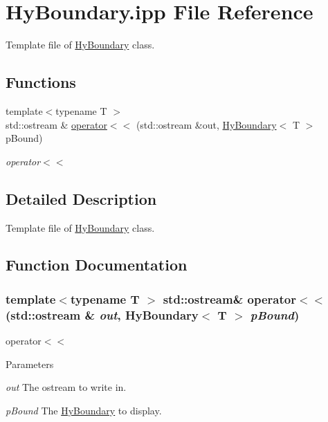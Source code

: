 \hypertarget{HyBoundary_8ipp}{
\section{HyBoundary.ipp File Reference}
\label{HyBoundary_8ipp}
}


Template file of \hyperlink{classHyBoundary}{HyBoundary} class.  


\subsection*{Functions}
\begin{DoxyCompactItemize}
\item 
{\footnotesize template$<$typename T $>$ }\\std::ostream \& \hyperlink{HyBoundary_8ipp_aa17bace639b97b7cdc5fa104cd3d7189}{operator$<$$<$} (std::ostream \&out, \hyperlink{classHyBoundary}{HyBoundary}$<$ T $>$ pBound)
\begin{DoxyCompactList}\small\item\em operator$<$$<$ \item\end{DoxyCompactList}\end{DoxyCompactItemize}


\subsection{Detailed Description}
Template file of \hyperlink{classHyBoundary}{HyBoundary} class. 

\subsection{Function Documentation}
\hypertarget{HyBoundary_8ipp_aa17bace639b97b7cdc5fa104cd3d7189}{
\subsubsection[{operator$<$$<$}]{\setlength{\rightskip}{0pt plus 5cm}template$<$typename T $>$ std::ostream\& operator$<$$<$ (std::ostream \& {\em out}, \/  {\bf HyBoundary}$<$ T $>$ {\em pBound})}}
\label{HyBoundary_8ipp_aa17bace639b97b7cdc5fa104cd3d7189}


operator$<$$<$ 


\begin{DoxyParams}{Parameters}
\item[{\em out}]The ostream to write in. \item[{\em pBound}]The \hyperlink{classHyBoundary}{HyBoundary} to display. \end{DoxyParams}
